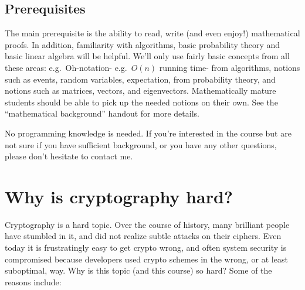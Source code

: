 \subsection{Prerequisites}\label{p-Prerequisites}

The main prerequisite is the ability to read, write (and even enjoy!)
mathematical proofs. In addition, familiarity with algorithms, basic
probability theory and basic linear algebra will be helpful. We'll only
use fairly basic concepts from all these areas: e.g.~Oh-notation-
e.g.~\(O(n)\) running time- from algorithms, notions such as events,
random variables, expectation, from probability theory, and notions such
as matrices, vectors, and eigenvectors. Mathematically mature students
should be able to pick up the needed notions on their own. See the
``mathematical background'' handout for more details.

No programming knowledge is needed. If you're interested in the course
but are not sure if you have sufficient background, or you have any
other questions, please don't hesitate to contact me.

\section{Why is cryptography hard?}\label{p-Why-is-cryptography-ha}

Cryptography is a hard topic. Over the course of history, many brilliant
people have stumbled in it, and did not realize subtle attacks on their
ciphers. Even today it is frustratingly easy to get crypto wrong, and
often system security is compromised because developers used crypto
schemes in the wrong, or at least suboptimal, way. Why is this topic
(and this course) so hard? Some of the reasons include:

